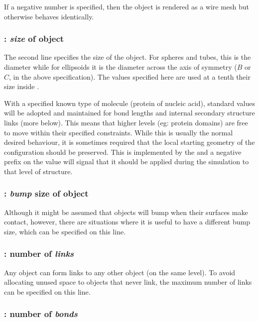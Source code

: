 If a negative number is specified, then the object is rendered as a wire mesh but otherwise
behaves identically.

\subsubsection{: {\em size} of object}

The second line specifies the size of the object.  For spheres and tubes, this is the diameter
while for ellipsoids it is the diameter across the axis of symmetry ($B$ or $C$, in the above 
specification).   The values specified here are used at a tenth their size inside \NAME.

With a specified known type of molecule (protein of nucleic acid), standard values will be
adopted and maintained for bond lengths and internal secondary structure links (more below).
This means that higher levels (eg: protein domains) are free to move within their specified
constraints.  While this is usually the normal desired behaviour, it is sometimes required
that the local starting geometry of the configuration should be preserved.  This is implemented
by the  and a negative prefix on the  value will signal that it should be
applied during the simulation to that level of structure. 

\subsubsection{: {\em bump} size of object}

Although it might be assumed that objects will bump when their surfaces make contact, however,
there are situations where it is useful to have a different bump size, which can be specified
on this line.

\subsubsection{: number of {\em links}}

Any object can form links to any other object (on the same level).  To avoid allocating unused
space to objects that never link, the maximum number of links can be specified on this line. 

\subsubsection{: number of {\em bonds}}

